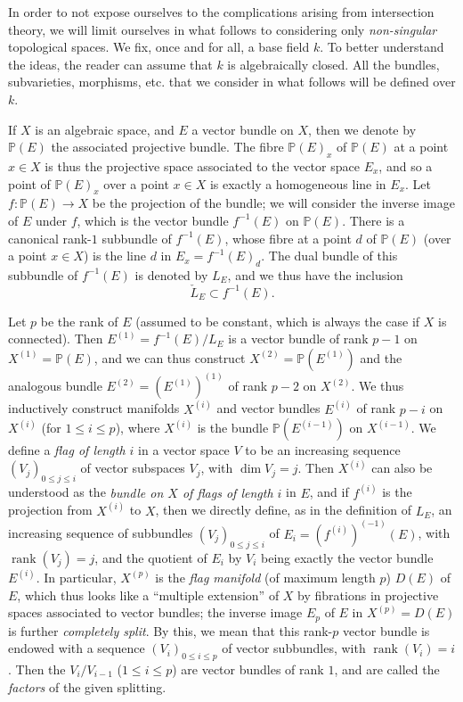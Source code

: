 \documentclass{article}
\begin{document}
In order to not expose ourselves to the complications arising from intersection theory, we will limit ourselves in what follows to considering only \emph{non-singular} topological spaces.
We fix, once and for all, a base field \(k\).
To better understand the ideas, the reader can assume that \(k\) is algebraically closed.
All the bundles, subvarieties, morphisms, etc. that we consider in what follows will be defined over \(k\).

If \(X\) is an algebraic space, and \(E\) a vector bundle on \(X\), then we denote by \(\mathbb{P}(E)\) the associated projective bundle.
The fibre \(\mathbb{P}(E)_x\) of \(\mathbb{P}(E)\) at a point \(x\in X\) is thus the projective space associated to the vector space \(E_x\), and so a point of \(\mathbb{P}(E)_x\) over a point \(x\in X\) is exactly a homogeneous line in \(E_x\).
Let \(f\colon\mathbb{P}(E)\to X\) be the projection of the bundle;
we will consider the inverse image of \(E\) under \(f\), which is the vector bundle \(f^{-1}(E)\) on \(\mathbb{P}(E)\).
There is a canonical rank-\(1\) subbundle of \(f^{-1}(E)\), whose fibre at a point \(d\) of \(\mathbb{P}(E)\) (over a point \(x\in X\)) is the line \(d\) in \(E_x=f^{-1}(E)_d\).
The dual bundle of this subbundle of \(f^{-1}(E)\) is denoted by \(L_E\), and we thus have the inclusion
\[
  \check{L}_E \subset f^{-1}(E).
\]

Let \(p\) be the rank of \(E\) (assumed to be constant, which is always the case if \(X\) is connected).
Then \(E^{(1)}=f^{-1}(E)/L_E\) is a vector bundle of rank \(p-1\) on \(X^{(1)}=\mathbb{P}(E)\), and we can thus construct \(X^{(2)}=\mathbb{P}(E^{(1)})\) and the analogous bundle \(E^{(2)}=(E^{(1)})^{(1)}\) of rank \(p-2\) on \(X^{(2)}\).
We thus inductively construct manifolds \(X^{(i)}\) and vector bundles \(E^{(i)}\) of rank \(p-i\) on \(X^{(i)}\) (for \(1\leqslant i\leqslant p\)), where \(X^{(i)}\) is the bundle \(\mathbb{P}(E^{(i-1)})\) on \(X^{(i-1)}\).
We define a \emph{flag of length \(i\)} in a vector space \(V\) to be an increasing sequence \((V_j)_{0\leqslant j\leqslant i}\) of vector subspaces \(V_j\), with \(\dim V_j=j\).
Then \(X^{(i)}\) can also be understood as the \emph{bundle on \(X\) of flags of length \(i\)} in \(E\), and if \(f^{(i)}\) is the projection from \(X^{(i)}\) to \(X\), then we directly define, as in the definition of \(L_E\), an increasing sequence of subbundles \((V_j)_{0\leqslant j\leqslant i}\) of \(E_i=(f^{(i)})^{(-1)}(E)\), with \(\operatorname{rank}(V_j)=j\), and the quotient of \(E_i\) by \(V_i\) being exactly the vector bundle \(E^{(i)}\).
In particular, \(X^{(p)}\) is the \emph{flag manifold} (of maximum length \(p\)) \(D(E)\) of \(E\), which thus looks like a ``multiple extension'' of \(X\) by fibrations in projective spaces associated to vector bundles;
the inverse image \(E_p\) of \(E\) in \(X^{(p)}=D(E)\) is further \emph{completely split}.
By this, we mean that this rank-\(p\) vector bundle is endowed with a sequence \((V_i)_{0\leqslant i\leqslant p}\) of vector subbundles,
with \(\operatorname{rank}(V_i)=i\).
Then the \(V_i/V_{i-1}\) (\(1\leqslant i\leqslant p\)) are vector bundles of rank \(1\), and are called the \emph{factors} of the given splitting.
\end{document}
